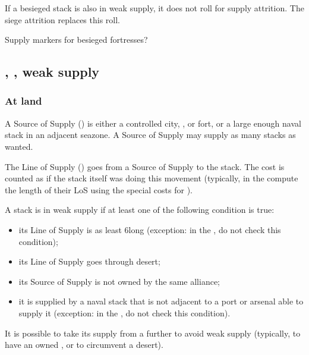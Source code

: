 If a besieged stack is also in weak supply, it does not roll for supply
attrition. The siege attrition replaces this roll.

\begin{todo}
  Supply markers for besieged fortresses?
\end{todo}

\subsection{\SoS, \LoS, weak supply}
\subsubsection{At land}
A Source of Supply (\SoS) is either a controlled city, \TP, \COL or fort, or a
large enough naval stack in an adjacent seazone. A Source of Supply may supply
as many stacks as wanted.

The Line of Supply (\LoS) goes from a Source of Supply to the stack. The \MP
cost is counted as if the stack itself was doing this movement (typically, \LD
in the \ROTW compute the length of their LoS using the special \MP costs for
\LD).

A stack is in weak supply if at least one of the following condition is true:
\begin{itemize}
\item its Line of Supply is as least 6\MP long (exception: in the \ROTW, \LD
  do not check this condition);
\item its Line of Supply goes through desert;
\item its Source of Supply is not owned by the same alliance;
\item it is supplied by a naval stack that is not adjacent to a port or
  arsenal able to supply it (exception: in the \ROTW, \LD do not check this
  condition).
\end{itemize}

It is possible to take its supply from a further \SoS to avoid weak supply
(typically, to have an owned \SoS, or to circumvent a desert).

